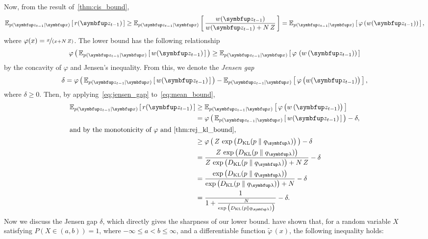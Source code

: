 \begin{proofEnd}
  Now, from the result of~\cref{thm:cis_bound},
  \begin{equation}
    \Esub{p(\vz_{t-1}\mid\vx)}{ r(\vz_{t-1}) } \geq \Esub{p(\vz_{t-1}\mid\vx)}{ \frac{w(\vz_{t-1})}{w(\vz_{t-1}) + N\,Z}} =
    \Esub{p(\vz_{t-1}\mid\vx)}{ \varphi\left( w(\vz_{t-1}) \right)  },\label{eq:mean_bound}
  \end{equation}
  where \(\varphi(x) = \nicefrac{x}{(x + N\,Z)}\).
  The lower bound has the following relationship
  \begin{equation}
    \varphi\left(\,
    \Esub{p(\vz_{t-1}\mid\vx)}{ w(\vz_{t-1}) }
    \,\right)
    \geq
    \Esub{p(\vz_{t-1}\mid\vx)}{ \varphi\,\left( w\,(\vz_{t-1}) \right)  }
  \end{equation}
  by the concavity of \(\varphi\) and Jensen's inequality.
  From this, we denote the \textit{Jensen gap}
  \begin{equation}
    \delta = 
    \varphi\left(\,
    \Esub{p(\vz_{t-1}\mid\vx)}{ w(\vz_{t-1}) }
    \,\right)
    -
    \Esub{p(\vz_{t-1}\mid\vx)}{ \varphi\,\big( w(\vz_{t-1}) \big)  },\label{eq:jensen_gap}
  \end{equation}
  where \(\delta \geq 0\).
  Then, by applying~\eqref{eq:jensen_gap} to~\eqref{eq:mean_bound},
  \begin{align}
    \Esub{p(\vz_{t-1}\mid\vx)}{ r(\vz_{t-1}) }
    &\geq \Esub{p(\vz_{t-1}\mid\vx)}{ \varphi\,\big( w\,(\vz_{t-1}) \big)  } \\
    &= \varphi\left(\,
    \Esub{p(\vz_{t-1}\mid\vx)}{ w(\vz_{t-1}) }
    \,\right) - \delta, \\
\intertext{and by the monotonicity of \(\varphi\) and~\cref{thm:rej_kl_bound},}
    &\geq \varphi\left(\,
    Z\,\exp\big(\DKL{p}{q_{\vlambda}}\big)
    \,\right) - \delta \\
    &=
    \frac{
      Z\,\exp\big(\DKL{p}{q_{\vlambda}}\big)
    }{
      Z\,\exp\big(\DKL{p}{q_{\vlambda}}\big) + N\,Z
    } - \delta \\
    &= \frac{
      \exp\big(\DKL{p}{q_{\vlambda}}\big)
    }{
      \exp\big(\DKL{p}{q_{\vlambda}}\big) + N
    } - \delta  \\
    &= \frac{1}{
       1 + \frac{N}{
         \exp\big(\DKL{p}{q_{\vlambda}}\big) 
      }
    } - \delta.
  \end{align}
  Now we discuss the Jensen gap \(\delta\), which directly gives the sharpness of our lower bound.
  \citet[Theorem 1]{liao_sharpening_2019} have shown that, for a random variable \(X\) satisfying \(P(X \in (a, b))=1\), where \(-\infty \leq a < b \leq \infty\), and a differentiable function \(\widetilde{\varphi}\,(x)\), the following inequality holds:

\end{proofEnd}
